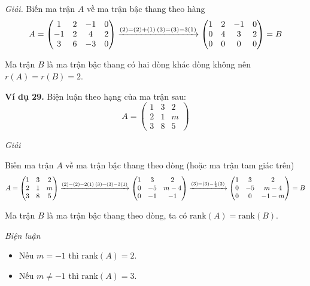 \textit{Giải.}
Biến ma trận \( A \) về ma trận bậc thang theo hàng
\[
A = \begin{pmatrix}
1 & 2 & -1 & 0 \\
-1 & 2 & 4 & 2 \\
3 & 6 & -3 & 0
\end{pmatrix}
\xrightarrow{(2) = (2) + (1) \\ (3) = (3) - 3(1)}
\begin{pmatrix}
1 & 2 & -1 & 0 \\
0 & 4 & 3 & 2 \\
0 & 0 & 0 & 0
\end{pmatrix} = B
\]

Ma trận \( B \) là ma trận bậc thang có hai dòng khác dòng không nên \( r(A) = r(B) = 2 \).

\textbf{Ví dụ 29.} Biện luận theo hạng của ma trận sau:
\[
A = \begin{pmatrix}
1 & 3 & 2 \\
2 & 1 & m \\
3 & 8 & 5
\end{pmatrix}
\]

\textit{Giải}

Biến ma trận \( A \) về ma trận bậc thang theo dòng (hoặc ma trận tam giác trên)
\[
A = \begin{pmatrix}
1 & 3 & 2 \\
2 & 1 & m \\
3 & 8 & 5
\end{pmatrix}
\xrightarrow{(2) = (2) - 2(1) \\ (3) = (3) - 3(1)}
\begin{pmatrix}
1 & 3 & 2 \\
0 & -5 & m - 4 \\
0 & -1 & -1
\end{pmatrix}
\xrightarrow{(3) = (3) - \frac{1}{5}(2)}
\begin{pmatrix}
1 & 3 & 2 \\
0 & -5 & m - 4 \\
0 & 0 & -1 - m
\end{pmatrix} = B
\]

Ma trận \( B \) là ma trận bậc thang theo dòng, ta có \(\text{rank}(A) = \text{rank}(B)\).

\textit{Biện luận}
\begin{itemize}
    \item Nếu \( m = -1 \) thì \(\text{rank}(A) = 2\).
    \item Nếu \( m \neq -1 \) thì \(\text{rank}(A) = 3\).
\end{itemize}

